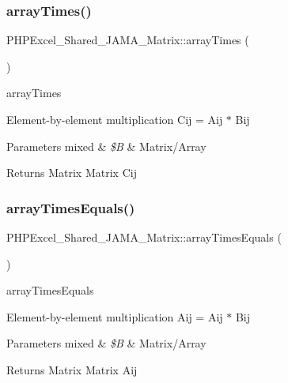 \subsubsection{\texorpdfstring{array\+Times()}{arrayTimes()}}
{\footnotesize\ttfamily P\+H\+P\+Excel\+\_\+\+Shared\+\_\+\+J\+A\+M\+A\+\_\+\+Matrix\+::array\+Times (\begin{DoxyParamCaption}{ }\end{DoxyParamCaption})}

array\+Times

Element-\/by-\/element multiplication Cij = Aij $\ast$ Bij 
\begin{DoxyParams}[1]{Parameters}
mixed & {\em \$B} & Matrix/\+Array \\
\hline
\end{DoxyParams}
\begin{DoxyReturn}{Returns}
Matrix Matrix Cij 
\end{DoxyReturn}
\mbox{\label{classPHPExcel__Shared__JAMA__Matrix_a9b9a1859aeac6e683d481706cffd9410}} 
\subsubsection{\texorpdfstring{array\+Times\+Equals()}{arrayTimesEquals()}}
{\footnotesize\ttfamily P\+H\+P\+Excel\+\_\+\+Shared\+\_\+\+J\+A\+M\+A\+\_\+\+Matrix\+::array\+Times\+Equals (\begin{DoxyParamCaption}{ }\end{DoxyParamCaption})}

array\+Times\+Equals

Element-\/by-\/element multiplication Aij = Aij $\ast$ Bij 
\begin{DoxyParams}[1]{Parameters}
mixed & {\em \$B} & Matrix/\+Array \\
\hline
\end{DoxyParams}
\begin{DoxyReturn}{Returns}
Matrix Matrix Aij 
\end{DoxyReturn}
\mbox{\label{classPHPExcel__Shared__JAMA__Matrix_ae8940d9b441c56736d17fa613cf9baf4}} 
